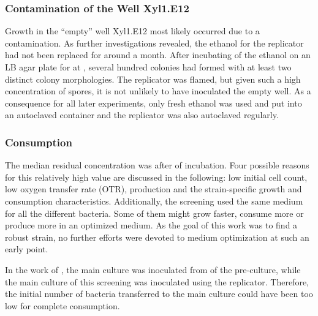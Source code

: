 \subsubsection{Contamination of the Well Xyl1.E12}
Growth in the \enquote{empty} well Xyl1.E12 most likely occurred due to a contamination. As further investigations revealed, the  ethanol for the replicator had not been replaced for around a month. After incubating  of the ethanol on an LB agar plate for  at , several hundred colonies had formed with at least two distinct colony morphologies. The replicator was flamed, but given such a high concentration of spores, it is not unlikely to have inoculated the empty well. As a consequence for all later experiments, only fresh ethanol was used and put into an autoclaved container and the replicator was also autoclaved regularly.

\subsubsection{\XYL{} Consumption}
The median residual \xyl{} concentration was  after  of incubation. Four possible reasons for this relatively high value are discussed in the following: low initial cell count, low oxygen transfer rate (OTR), \eps{} production and the strain-specific growth and \xyl{} consumption characteristics. Additionally, the screening used the same medium for all the different bacteria. Some of them might grow faster, consume more \xyl{} or produce more \eps{} in an optimized medium. As the goal of this work was to find a robust strain, no further efforts were devoted to medium optimization at such an early point.

In the work of \textcite{Ruehmann2015b}, the main culture was inoculated from  of the pre-culture, while the main culture of this screening was inoculated using the replicator. Therefore, the initial number of bacteria transferred to the main culture could have been too low for complete \xyl{} consumption.


